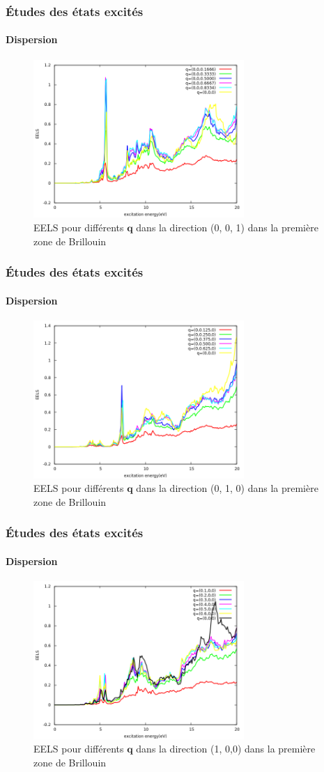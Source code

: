 \documentclass[a4paper, 12pt, twoside, titlepage, french]{beamer}
\newcommand{\vb}[1]{\textbf{#1}}
\begin{document}
\begin{frame}
\frametitle{Études des états excités}
\framesubtitle{Dispersion}
\begin{figure}[!h]
    \centering
    \includegraphics[width=8cm]{q6}
    \caption{EELS pour différents $\vb{q}$ dans la direction (0, 0, 1) dans la première zone de Brillouin}\label{fig-q6}
\end{figure}

\end{frame}
\begin{frame}
\frametitle{Études des états excités}
\framesubtitle{Dispersion}
\begin{figure}[!h]
    \centering
    \includegraphics[width=8cm]{q8}
        \caption{EELS pour différents $\vb{q}$ dans la direction (0, 1, 0) dans la première zone de Brillouin}\label{fig-q6}
\end{figure}

\end{frame}
\begin{frame}
\frametitle{Études des états excités}
\framesubtitle{Dispersion}
\begin{figure}[!h]
    \centering
    \includegraphics[width=8cm]{q10}
    \caption{EELS pour différents $\vb{q}$ dans la direction (1, 0,0) dans la première zone de Brillouin}\label{fig-q6}
\end{figure}

\end{frame}
\end{document}
